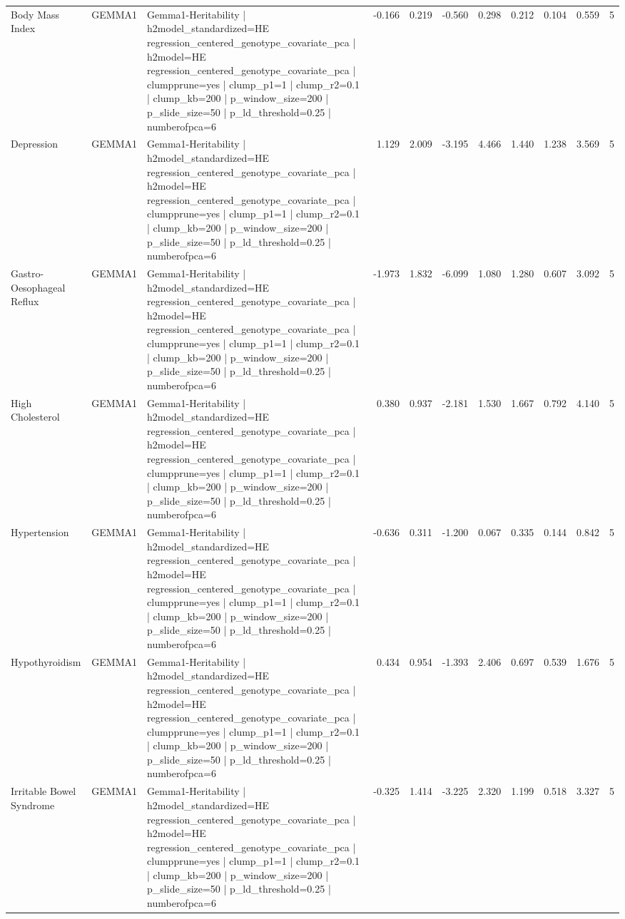 \begin{landscape}
\begin{longtable}{p{2.4cm}p{1.8cm}p{6.0cm}rrrrrrrr}
Body Mass Index & GEMMA1 & Gemma1-Heritability | h2model\_standardized=HE regression\_centered\_genotype\_covariate\_pca | h2model=HE regression\_centered\_genotype\_covariate\_pca | clumpprune=yes | clump\_p1=1 | clump\_r2=0.1 | clump\_kb=200 | p\_window\_size=200 | p\_slide\_size=50 | p\_ld\_threshold=0.25 | numberofpca=6 & -0.166 & 0.219 & -0.560 & 0.298 & 0.212 & 0.104 & 0.559 & 5 \\
Depression & GEMMA1 & Gemma1-Heritability | h2model\_standardized=HE regression\_centered\_genotype\_covariate\_pca | h2model=HE regression\_centered\_genotype\_covariate\_pca | clumpprune=yes | clump\_p1=1 | clump\_r2=0.1 | clump\_kb=200 | p\_window\_size=200 | p\_slide\_size=50 | p\_ld\_threshold=0.25 | numberofpca=6 & 1.129 & 2.009 & -3.195 & 4.466 & 1.440 & 1.238 & 3.569 & 5 \\
Gastro-Oesophageal Reflux & GEMMA1 & Gemma1-Heritability | h2model\_standardized=HE regression\_centered\_genotype\_covariate\_pca | h2model=HE regression\_centered\_genotype\_covariate\_pca | clumpprune=yes | clump\_p1=1 | clump\_r2=0.1 | clump\_kb=200 | p\_window\_size=200 | p\_slide\_size=50 | p\_ld\_threshold=0.25 | numberofpca=6 & -1.973 & 1.832 & -6.099 & 1.080 & 1.280 & 0.607 & 3.092 & 5 \\
High Cholesterol & GEMMA1 & Gemma1-Heritability | h2model\_standardized=HE regression\_centered\_genotype\_covariate\_pca | h2model=HE regression\_centered\_genotype\_covariate\_pca | clumpprune=yes | clump\_p1=1 | clump\_r2=0.1 | clump\_kb=200 | p\_window\_size=200 | p\_slide\_size=50 | p\_ld\_threshold=0.25 | numberofpca=6 & 0.380 & 0.937 & -2.181 & 1.530 & 1.667 & 0.792 & 4.140 & 5 \\
Hypertension & GEMMA1 & Gemma1-Heritability | h2model\_standardized=HE regression\_centered\_genotype\_covariate\_pca | h2model=HE regression\_centered\_genotype\_covariate\_pca | clumpprune=yes | clump\_p1=1 | clump\_r2=0.1 | clump\_kb=200 | p\_window\_size=200 | p\_slide\_size=50 | p\_ld\_threshold=0.25 | numberofpca=6 & -0.636 & 0.311 & -1.200 & 0.067 & 0.335 & 0.144 & 0.842 & 5 \\
Hypothyroidism & GEMMA1 & Gemma1-Heritability | h2model\_standardized=HE regression\_centered\_genotype\_covariate\_pca | h2model=HE regression\_centered\_genotype\_covariate\_pca | clumpprune=yes | clump\_p1=1 | clump\_r2=0.1 | clump\_kb=200 | p\_window\_size=200 | p\_slide\_size=50 | p\_ld\_threshold=0.25 | numberofpca=6 & 0.434 & 0.954 & -1.393 & 2.406 & 0.697 & 0.539 & 1.676 & 5 \\
Irritable Bowel Syndrome & GEMMA1 & Gemma1-Heritability | h2model\_standardized=HE regression\_centered\_genotype\_covariate\_pca | h2model=HE regression\_centered\_genotype\_covariate\_pca | clumpprune=yes | clump\_p1=1 | clump\_r2=0.1 | clump\_kb=200 | p\_window\_size=200 | p\_slide\_size=50 | p\_ld\_threshold=0.25 | numberofpca=6 & -0.325 & 1.414 & -3.225 & 2.320 & 1.199 & 0.518 & 3.327 & 5 \\

\end{longtable}
\end{landscape}
